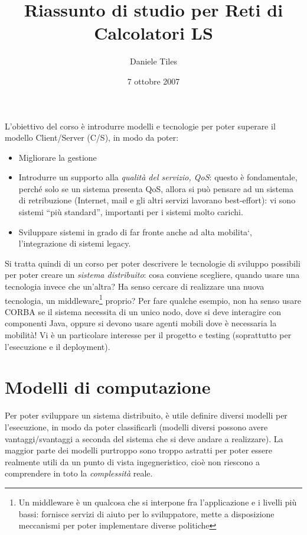 \documentclass[a4paper,12pt]{article}
\title{Riassunto di studio per Reti di Calcolatori LS}
\author{Daniele Tiles}
\date{7 ottobre 2007}
\begin{document}
\maketitle
\tableofcontents
L'obiettivo del corso è introdurre modelli e tecnologie per poter superare il modello Client/Server (C/S), in modo 
da poter:
\begin{itemize}
 \item Migliorare la gestione
 \item Introdurre un supporto alla \textit{qualità del servizio, QoS}: questo è fondamentale, perché solo se un sistema
 presenta QoS, allora si può pensare ad un sistema di retribuzione (Internet, mail e gli altri servizi
lavorano best-effort): vi sono sistemi ``più standard'', importanti per i sistemi molto carichi.
\item Sviluppare sistemi in grado di far fronte anche ad alta mobilita`, l'integrazione di sistemi legacy.
\end{itemize}
Si tratta quindi di un corso per poter descrivere le tecnologie di sviluppo possibili per poter creare un
\textit{sistema distribuito}: cosa conviene scegliere, quando usare una tecnologia invece che un'altra? Ha senso cercare
di realizzare una nuova tecnologia, un middleware\footnote{Un middleware è un qualcosa che si interpone fra
l'applicazione e i livelli più bassi: fornisce servizi di aiuto per lo sviluppatore, mette a disposizione meccanismi per
poter implementare diverse politiche} proprio? Per fare qualche esempio, non ha senso usare CORBA
se il sistema necessita di un unico nodo, dove si deve interagire con componenti Java, oppure si devono usare agenti
mobili dove è necessaria la mobilità! Vi è un particolare interesse per il progetto e testing (soprattutto per
l'esecuzione e il deployment).

\section{Modelli di computazione}
Per poter sviluppare un sistema distribuito, è utile definire diversi modelli per l'esecuzione, in modo da poter
classificarli (modelli diversi possono avere vantaggi/svantaggi a seconda del sistema che si deve andare a realizzare).
La maggior parte dei modelli purtroppo sono troppo astratti per poter essere realmente utili da un punto di vista
ingegneristico, cioè non riescono a comprendere in toto la \textit{complessità} reale.
\newline
\end{document}
